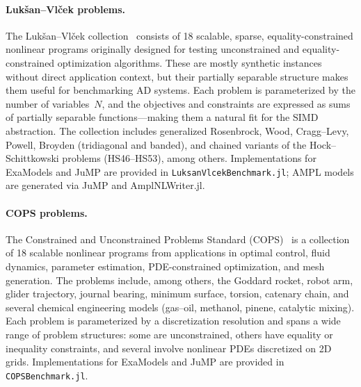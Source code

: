 \documentclass[11pt]{article}
\begin{document}
\paragraph{Luk\v{s}an--Vl\v{c}ek problems.}
The Luk\v{s}an--Vl\v{c}ek collection~\citep{lukVsanSparsePartiallySeparable} consists of 18 scalable, sparse, equality-constrained nonlinear programs originally designed for testing unconstrained and equality-constrained optimization algorithms. These are mostly synthetic instances without direct application context, but their partially separable structure makes them useful for benchmarking AD systems. Each problem is parameterized by the number of variables~$N$, and the objectives and constraints are expressed as sums of partially separable functions---making them a natural fit for the SIMD abstraction. The collection includes generalized Rosenbrock, Wood, Cragg--Levy, Powell, Broyden (tridiagonal and banded), and chained variants of the Hock--Schittkowski problems (HS46--HS53), among others. Implementations for ExaModels and JuMP are provided in \texttt{LuksanVlcekBenchmark.jl}; AMPL models are generated via JuMP and AmplNLWriter.jl.

\paragraph{COPS problems.}
The Constrained and Unconstrained Problems Standard (COPS)~\citep{dolanBenchmarkingOptimizationSoftware2001} is a collection of 18 scalable nonlinear programs from applications in optimal control, fluid dynamics, parameter estimation, PDE-constrained optimization, and mesh generation. The problems include, among others, the Goddard rocket, robot arm, glider trajectory, journal bearing, minimum surface, torsion, catenary chain, and several chemical engineering models (gas--oil, methanol, pinene, catalytic mixing). Each problem is parameterized by a discretization resolution and spans a wide range of problem structures: some are unconstrained, others have equality or inequality constraints, and several involve nonlinear PDEs discretized on 2D grids. Implementations for ExaModels and JuMP are provided in \texttt{COPSBenchmark.jl}.
\end{document}
